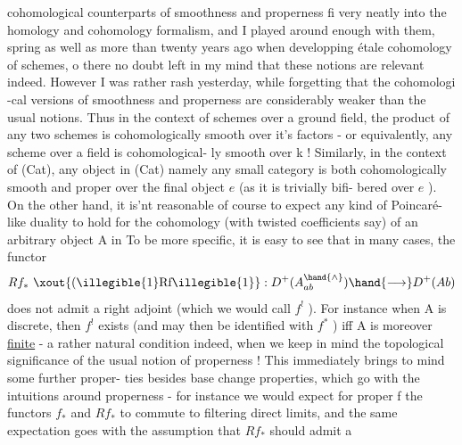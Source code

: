 
cohomological counterparts of smoothness and properness fi very neatly
into the homology and cohomology formalism,  and I played around enough
with them,   spring as well as more than twenty years ago when
developping étale cohomology of schemes, o there   no doubt
left in my mind that these notions are relevant indeed.  However I
 was rather rash yesterday,  while forgetting that the cohomologi%
-cal versions of smoothness and properness are considerably weaker than
the usual notions.  Thus in the context of schemes over a ground field,
the product of any two schemes is cohomologically smooth over it's
factors  -  or equivalently,  any scheme over a field  is cohomological-%
ly smooth over k !  Similarly,  in the context of (Cat),  any 
object in (Cat)\hand{,} namely any small category\hand{,} is both cohomologically
smooth and proper over the final object $e$  (as it is trivially bifi-%
bered over $e$ ).  On the other hand,  it is'nt reasonable\hand{,} of course to
expect any kind of Poincaré-like duality to hold for the cohomology
(with twisted coefficients say) of an arbitrary object A in  To be
more specific,  it is easy to see that in many cases,  the functor
\[ Rf_{*}\ \text{\xout{(\illegible{1}Rf\illegible{1}}} : D^{+}(A^{\hand{\wedge}}_{ab}) \hand{\longrightarrow} D^{+}(Ab) \]
does not admit a right adjoint (which we would call $f^{!}$ ).  For instance
when A is discrete,  then $f^{!}$  exists (and may then be identified with
$f^{*}$ ) iff A is moreover \uline{finite}  -  a rather natural condition indeed,
when we keep in mind the topological significance of the usual notion
of properness !  This immediately brings to mind some further proper-%
ties besides base change properties,  which go with the intuitions
around properness  -  for instance we would expect for proper f the
functors $f_{*}$ and $Rf_{*}$ to commute to filtering direct limits, and the
same expectation goes with the assumption that $Rf_{*}$ should admit a
